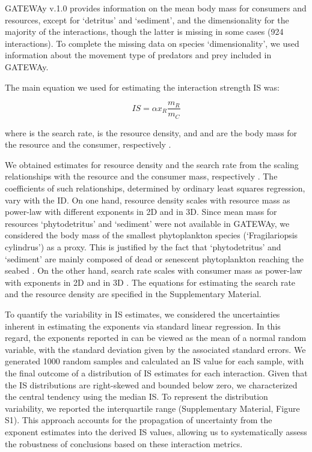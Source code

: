 \documentclass[gc, manuscript]{copernicus}
\begin{document}
GATEWAy v.1.0 provides information on the mean body mass for consumers
and resources, except for `detritus' and `sediment', and the
dimensionality for the majority of the interactions, though the latter
is missing in some cases (924 interactions). To complete the missing
data on species `dimensionality', we used information about the movement
type of predators and prey included in GATEWAy.

The main equation we used for estimating the interaction strength IS
was:

\begin{equation}
IS = \alpha x_R \frac{m_R}{m_C}
\end{equation}

where \vec{\alpha} is the search rate,  is the resource
density, and  and  are the body mass for the resource
and the consumer, respectively \citep{Pawar2012}.

We obtained estimates for resource density and the search rate from the
scaling relationships with the resource and the consumer mass,
respectively \citep{Pawar2012}. The coefficients of such relationships,
determined by ordinary least squares regression, vary with the ID. On
one hand, resource density scales with resource mass as power-law with
different exponents in 2D and in 3D. Since mean mass for resources
`phytodetritus' and `sediment' were not available in GATEWAy, we
considered the body mass of the smallest phytoplankton species
(`Fragilariopsis cylindrus') as a proxy. This is justified by the fact
that `phytodetritus' and `sediment' are mainly composed of dead or
senescent phytoplankton reaching the seabed \citep{Wolanski2011}. On the
other hand, search rate scales with consumer mass as power-law with
exponents in 2D and in 3D \citep{Pawar2012}. The equations for
estimating the search rate and the resource density are specified in the
Supplementary Material.

To quantify the variability in IS estimates, we considered the
uncertainties inherent in estimating the exponents via standard linear
regression. In this regard, the exponents reported in \citet{Pawar2012}
can be viewed as the mean of a normal random variable, with the standard
deviation given by the associated standard errors. We generated 1000
random samples and calculated an IS value for each sample, with the
final outcome of a distribution of IS estimates for each interaction.
Given that the IS distributions are right-skewed and bounded below zero,
we characterized the central tendency using the median IS. To represent
the distribution variability, we reported the interquartile range
(Supplementary Material, Figure S1). This approach accounts for the
propagation of uncertainty from the exponent estimates into the derived
IS values, allowing us to systematically assess the robustness of
conclusions based on these interaction metrics.
\end{document}
